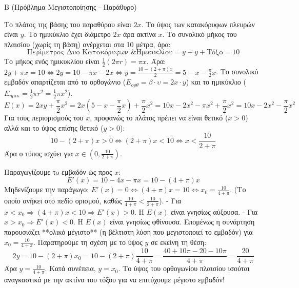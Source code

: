 
\begin{thema}{Β}
(Πρόβλημα Μεγιστοποίησης - Παράθυρο)
\begin{erwthma}
\item Το πλάτος της βάσης του παραθύρου είναι $2x$. Το ύψος των κατακόρυφων πλευρών είναι $y$. Το ημικύκλιο έχει διάμετρο $2x$ άρα ακτίνα $x$.
Το συνολικό μήκος του πλαισίου (χωρίς τη βάση) ανέρχεται στα 10 μέτρα, άρα:
\[ \text{Περίμετρος Δυο Κατακόρυφων \& Ημικυκλίου} = y + y + \text{Τόξο} = 10 \]
Το μήκος ενός ημικυκλίου είναι $\frac{1}{2}(2\pi r) = \pi x$.
Άρα: $2y + \pi x = 10 \Leftrightarrow 2y = 10 - \pi x - 2x \Leftrightarrow y = \frac{10 - (2+\pi)x}{2} = 5 - x - \frac{\pi}{2}x$.
Το συνολικό εμβαδόν απαρτίζεται από το ορθογώνιο ($E_{ορθ} = \beta \cdot \upsilon = 2x \cdot y$) και το ημικύκλιο ($E_{ημικ} = \frac{1}{2}\pi r^2 = \frac{1}{2}\pi x^2$).
\[ E(x) = 2xy + \frac{\pi}{2}x^2 = 2x \left( 5 - x - \frac{\pi}{2}x \right) + \frac{\pi}{2}x^2 = 10x - 2x^2 - \pi x^2 + \frac{\pi}{2}x^2 = 10x - 2x^2 - \frac{\pi}{2}x^2 \]
Για τους περιορισμούς του $x$, προφανώς το πλάτος πρέπει να είναι θετικό ($x > 0$) αλλά και το ύψος επίσης θετικό ($y > 0$):
\[ 10 - (2+\pi)x > 0 \Leftrightarrow (2+\pi)x < 10 \Leftrightarrow x < \frac{10}{2+\pi} \]
Άρα ο τύπος ισχύει για $x \in \left(0, \frac{10}{2+\pi} \right)$.

\item Παραγωγίζουμε τo εμβαδόν ώς προς $x$:
\[ E'(x) = 10 - 4x - \pi x = 10 - (4+\pi)x \]
Μηδενίζουμε την παράγωγο: $E'(x) = 0 \Leftrightarrow (4+\pi)x = 10 \Leftrightarrow x_0 = \frac{10}{4+\pi}$. (Το οποίο ανήκει στο πεδίο ορισμού, καθώς $\frac{10}{4+\pi} < \frac{10}{2+\pi}$).
- Για $x < x_0 \Rightarrow (4+\pi)x < 10 \Rightarrow E'(x) > 0$. Η $E(x)$ είναι γνησίως αύξουσα.
- Για $x > x_0 \Rightarrow E'(x) < 0$. Η $E(x)$ είναι γνησίως φθίνουσα.
Επομένως η συνάρτηση παρουσιάζει **ολικό μέγιστο** (η βέλτιστη λύση που μεγιστοποιεί το εμβαδόν) για $x_0 = \frac{10}{4+\pi}$.
Παρατηρούμε τη σχέση με το ύψος $y$ σε εκείνη τη θέση:
\[ 2y = 10 - (2+\pi)x_0 = 10 - (2+\pi)\frac{10}{4+\pi} = \frac{40+10\pi - 20 - 10\pi}{4+\pi} = \frac{20}{4+\pi} \]
Άρα $y = \frac{10}{4+\pi}$. Κατά συνέπεια, $y = x_0$. Το ύψος του ορθογωνίου πλαισίου ισούται αναγκαστικά με την ακτίνα του τόξου για να επιτύχουμε μέγιστο εμβαδόν!


\end{erwthma}
\end{thema}
